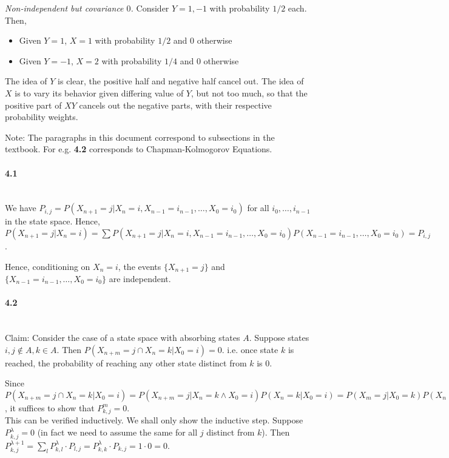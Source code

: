 \documentclass[a4paper]{article}
\begin{document}
\emph{Non-independent but covariance $0$.} Consider $Y = 1, -1$ with probability $1/2$ each. Then,
\begin{itemize}
	\item Given $Y = 1$, $X = 1$ with probability $1/2$ and $0$ otherwise
	\item Given $Y = -1$, $X = 2$ with probability $1/4$ and $0$ otherwise
\end{itemize}
The idea of $Y$ is clear, the positive half and negative half cancel out. The idea of $X$ is to vary its behavior given differing value of $Y$, but not too much, so that the positive part of $XY$ cancels out the negative parts, with their respective probability weights.

Note: The paragraphs in this document correspond to subsections in the textbook. For e.g. \textbf{4.2} corresponds to Chapman-Kolmogorov Equations.

\paragraph{4.1}\mbox{}\\
We have $P_{i,j} = P(X_{n+1} = j | X_n = i, X_{n-1} = i_{n-1},\dots,X_0=i_0)$ for all $i_0,\dots,i_{n-1}$ in the state space. Hence, $P(X_{n+1}=j|X_n=i)=\sum P(X_{n+1} = j | X_n = i, X_{n-1} = i_{n-1},\dots,X_0=i_0)P(X_{n-1}=i_{n-1},\dots,X_0=i_0) = P_{i,j}$.

Hence, conditioning on $X_n=i$, the events $\{X_{n+1}=j\}$ and $\{X_{n-1}=i_{n-1},\dots,X_0=i_0\}$ are independent.

\paragraph{4.2}\mbox{}\\
Claim: Consider the case of a state space with absorbing states $A$. Suppose states $i,j\notin A, k\in A$. Then $P(X_{n+m} = j\cap X_{n}=k | X_0 = i) = 0$. i.e. once state $k$ is reached, the probability of reaching any other state distinct from $k$ is $0$.

Since $P(X_{n+m} = j\cap X_n = k | X_0 = i) = P(X_{n+m}=j|X_n=k\land X_0=i)P(X_n=k|X_0=i)=P(X_m=j|X_0=k)P(X_n=k|X_0=i)$, it suffices to show that $P_{k,j}^m = 0$.\\
This can be verified inductively. We shall only show the inductive step. Suppose $P_{k,j}^\lambda = 0$ (in fact we need to assume the same for all $j$ distinct from $k$). Then $P_{k,j}^{\lambda+1} = \sum_{l}P_{k,l}^\lambda\cdot P_{l,j} = P_{k,k}^\lambda\cdot P_{k,j} = 1\cdot 0=0$.
\end{document}

